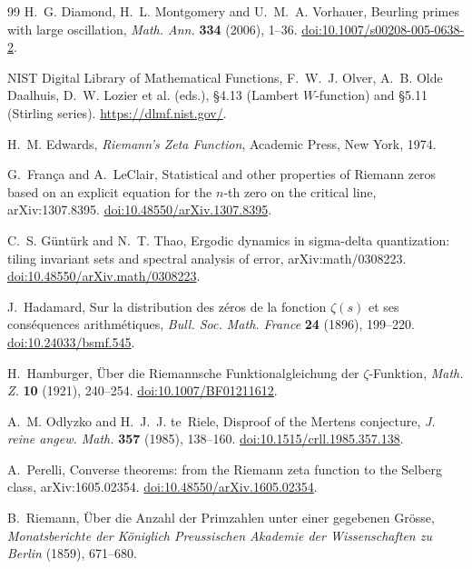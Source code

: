 \documentclass[11pt,reqno]{amsart}
\numberwithin{equation}{section}
\theoremstyle{plain}
\theoremstyle{definition}
\theoremstyle{remark}
\begin{document}
\begin{thebibliography}{99}
H.~G. Diamond, H.~L. Montgomery and U.~M.~A. Vorhauer, Beurling primes with large oscillation, \emph{Math. Ann.} \textbf{334} (2006), 1--36.
\href{https://doi.org/10.1007/s00208-005-0638-2}{doi:10.1007/s00208-005-0638-2}.

NIST Digital Library of Mathematical Functions, F.~W.~J. Olver, A.~B. Olde Daalhuis, D.~W. Lozier et al. (eds.), \S4.13 (Lambert $W$-function) and \S5.11 (Stirling series).
\url{https://dlmf.nist.gov/}.

H.~M. Edwards, \emph{Riemann's Zeta Function}, Academic Press, New York, 1974.

G.~Fran\c{c}a and A.~LeClair, Statistical and other properties of Riemann zeros based on an explicit equation for the $n$-th zero on the critical line, arXiv:1307.8395.
\href{https://doi.org/10.48550/arXiv.1307.8395}{doi:10.48550/arXiv.1307.8395}.

C.~S. G\"unt\"urk and N.~T. Thao, Ergodic dynamics in sigma-delta quantization: tiling invariant sets and spectral analysis of error, arXiv:math/0308223.
\href{https://doi.org/10.48550/arXiv.math/0308223}{doi:10.48550/arXiv.math/0308223}.

J.~Hadamard, Sur la distribution des z\'eros de la fonction $\zeta(s)$ et ses cons\'equences arithm\'etiques, \emph{Bull. Soc. Math. France} \textbf{24} (1896), 199--220.
\href{https://doi.org/10.24033/bsmf.545}{doi:10.24033/bsmf.545}.

H.~Hamburger, \"Uber die Riemannsche Funktionalgleichung der $\zeta$-Funktion, \emph{Math. Z.} \textbf{10} (1921), 240--254.
\href{https://doi.org/10.1007/BF01211612}{doi:10.1007/BF01211612}.

A.~M. Odlyzko and H.~J.~J. te~Riele, Disproof of the Mertens conjecture, \emph{J. reine angew. Math.} \textbf{357} (1985), 138--160.
\href{https://doi.org/10.1515/crll.1985.357.138}{doi:10.1515/crll.1985.357.138}.

A.~Perelli, Converse theorems: from the Riemann zeta function to the Selberg class, arXiv:1605.02354.
\href{https://doi.org/10.48550/arXiv.1605.02354}{doi:10.48550/arXiv.1605.02354}.

B.~Riemann, \"Uber die Anzahl der Primzahlen unter einer gegebenen Gr\"osse, \emph{Monatsberichte der K\"oniglich Preussischen Akademie der Wissenschaften zu Berlin} (1859), 671--680.


\end{thebibliography}
\end{document}
